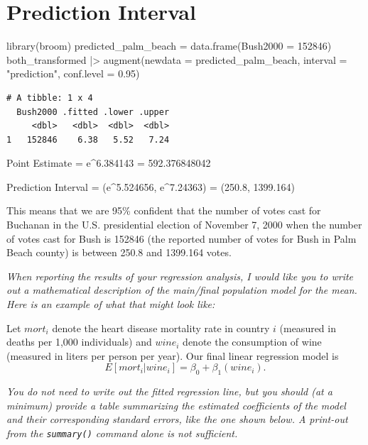 \documentclass[
  letterpaper,
  DIV=11,
  numbers=noendperiod]{scrartcl}
\newenvironment{Shaded}{\begin{snugshade}}{\end{snugshade}}
\newcommand{\AttributeTok}[1]{\textcolor[rgb]{0.40,0.45,0.13}{#1}}
\newcommand{\DecValTok}[1]{\textcolor[rgb]{0.68,0.00,0.00}{#1}}
\newcommand{\FloatTok}[1]{\textcolor[rgb]{0.68,0.00,0.00}{#1}}
\newcommand{\FunctionTok}[1]{\textcolor[rgb]{0.28,0.35,0.67}{#1}}
\newcommand{\NormalTok}[1]{\textcolor[rgb]{0.00,0.23,0.31}{#1}}
\newcommand{\OtherTok}[1]{\textcolor[rgb]{0.00,0.23,0.31}{#1}}
\newcommand{\SpecialCharTok}[1]{\textcolor[rgb]{0.37,0.37,0.37}{#1}}
\newcommand{\StringTok}[1]{\textcolor[rgb]{0.13,0.47,0.30}{#1}}
\begin{document}
\hypertarget{prediction-interval}{%
\section{Prediction Interval}\label{prediction-interval}}

\begin{Shaded}
\begin{Highlighting}[]
\FunctionTok{library}\NormalTok{(broom)}
\NormalTok{predicted\_palm\_beach }\OtherTok{=} \FunctionTok{data.frame}\NormalTok{(}\AttributeTok{Bush2000 =} \DecValTok{152846}\NormalTok{)}
\NormalTok{both\_transformed }\SpecialCharTok{|\textgreater{}} \FunctionTok{augment}\NormalTok{(}\AttributeTok{newdata =}\NormalTok{ predicted\_palm\_beach, }\AttributeTok{interval =} \StringTok{"prediction"}\NormalTok{, }\AttributeTok{conf.level =} \FloatTok{0.95}\NormalTok{)}
\end{Highlighting}
\end{Shaded}

\begin{verbatim}
# A tibble: 1 x 4
  Bush2000 .fitted .lower .upper
     <dbl>   <dbl>  <dbl>  <dbl>
1   152846    6.38   5.52   7.24
\end{verbatim}

Point Estimate = e\^{}6.384143 = 592.376848042

Prediction Interval = (e\^{}5.524656, e\^{}7.24363) = (250.8, 1399.164)

This means that we are 95\% confident that the number of votes cast for
Buchanan in the U.S. presidential election of November 7, 2000 when the
number of votes cast for Bush is 152846 (the reported number of votes
for Bush in Palm Beach county) is between 250.8 and 1399.164 votes.

\emph{When reporting the results of your regression analysis, I would
like you to write out a mathematical description of the main/final
population model for the mean. Here is an example of what that might
look like:}

Let \(mort_i\) denote the heart disease mortality rate in country \(i\)
(measured in deaths per 1,000 individuals) and \(wine_i\) denote the
consumption of wine (measured in liters per person per year). Our final
linear regression model is
\[E[mort_i | wine_i] = \beta_0 + \beta_1\left(wine_i\right).\]

\emph{You do not need to write out the fitted regression line, but you
should (at a minimum) provide a table summarizing the estimated
coefficients of the model and their corresponding standard errors, like
the one shown below. A print-out from the \texttt{summary()} command
alone is not sufficient.}
\end{document}
